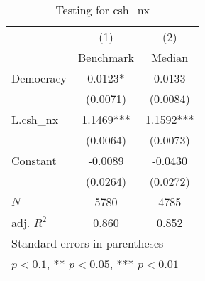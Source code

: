 \begin{table}[htbp]\centering
\def\sym#1{\ifmmode^{#1}\else\(^{#1}\)\fi}
\caption{Testing for csh\_nx \label{tab:regression4}}
\begin{tabular}{l*{2}{c}}
\hline\hline
            &\multicolumn{1}{c}{(1)}&\multicolumn{1}{c}{(2)}\\
            &\multicolumn{1}{c}{Benchmark}&\multicolumn{1}{c}{Median}\\
\hline
Democracy   &      0.0123*  &      0.0133   \\
            &    (0.0071)   &    (0.0084)   \\
[1em]
L.csh\_nx    &      1.1469***&      1.1592***\\
            &    (0.0064)   &    (0.0073)   \\
[1em]
Constant    &     -0.0089   &     -0.0430   \\
            &    (0.0264)   &    (0.0272)   \\
\hline
\(N\)       &        5780   &        4785   \\
adj. \(R^{2}\)&       0.860   &       0.852   \\
\hline\hline
\multicolumn{3}{l}{\footnotesize Standard errors in parentheses}\\
\multicolumn{3}{l}{\footnotesize * \(p<0.1\), ** \(p<0.05\), *** \(p<0.01\)}\\
\end{tabular}
\end{table}

